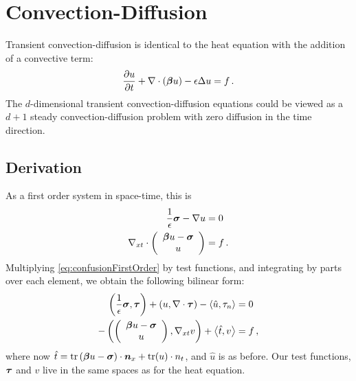 \documentclass[Proposal.tex]{subfiles}
\begin{document}
\section{Convection-Diffusion}
Transient convection-diffusion is identical to the heat equation with the addition of a convective term:
\begin{equation*}
\frac{\partial u}{\partial t}+\nabla\cdot(\boldsymbol\beta u)-\epsilon\Delta u=f\,.
\end{equation*}
The $d$-dimensional transient convection-diffusion equations could be viewed as a $d+1$ steady convection-diffusion problem with zero diffusion in the time direction.

\subsection{Derivation}
As a first order system in space-time, this is
\begin{equation}
\label{eq:confusionFirstOrder}
\begin{aligned}
\frac{1}{\epsilon}\boldsymbol\sigma-\nabla u&=0\\
\nabla_{xt}\cdot\left( \begin{array}{c} \boldsymbol\beta u-\boldsymbol\sigma\\ u\\ \end{array} \right)&=f\,.
\end{aligned}
\end{equation}
Multiplying \eqref{eq:confusionFirstOrder} by test functions, and integrating by parts over each element, we obtain the following bilinear form:
\begin{equation}
\label{eq:confusionBF}
	\begin{aligned}
		\left( \frac{1}{\epsilon}\boldsymbol\sigma,\boldsymbol\tau \right)+\left( u,\nabla\cdot\boldsymbol\tau \right)-\left\langle \hat u,\tau_n \right\rangle&=0\\
		-\left( \left( \begin{array}{c} \boldsymbol\beta u-\boldsymbol\sigma\\ u\\ \end{array} \right),\nabla_{xt} v \right)+\left\langle \hat t,v \right\rangle&=f\,,
	\end{aligned}
\end{equation}
where now $\hat t=\operatorname*{tr}\left( \boldsymbol\beta u-\boldsymbol\sigma \right)\cdot\boldsymbol n_x+\operatorname*{tr}(u)\cdot n_t$, and $\hat u$ is as before. Our test functions, $\boldsymbol\tau$ and $v$ live in the same spaces as for the heat equation.
\end{document}
